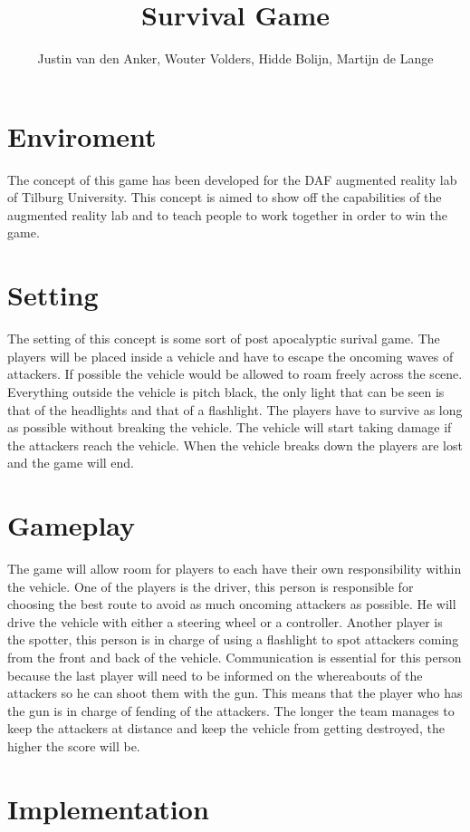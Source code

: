 \documentclass[10pt,a4paper]{article}
\author{Justin van den Anker, Wouter Volders, Hidde Bolijn, Martijn de Lange}
\title{Survival Game}
\begin{document}
\maketitle

\section{Enviroment}
The concept of this game has been developed for the DAF augmented reality lab of Tilburg University. This concept is aimed to show off the capabilities of the augmented reality lab and to teach people to work together in order to win the game.

\section{Setting}
The setting of this concept is some sort of post apocalyptic surival game. The players will be placed inside a vehicle and have to escape the oncoming waves of attackers. If possible the vehicle would be allowed to roam freely across the scene. Everything outside the vehicle is pitch black, the only light that can be seen is that of the headlights and that of a flashlight. The players have to survive as long as possible without breaking the vehicle. The vehicle will start taking damage if the attackers reach the vehicle. When the vehicle breaks down the players are lost and the game will end.

\section{Gameplay}
The game will allow room for players to each have their own responsibility within the vehicle. One of the players is the driver, this person is responsible for choosing the best route to avoid as much oncoming attackers as possible. He will drive the vehicle with either a steering wheel or a controller. Another player is the spotter, this person is in charge of using a flashlight to spot attackers coming from the front and back of the vehicle. Communication is essential for this person because the last player will need to be informed on the whereabouts of the attackers so he can shoot them with  the gun. This means that the player who has the gun is in charge of fending of the attackers. The longer the team manages to keep the attackers at distance and keep the vehicle from getting destroyed, the higher the score will be.

\section{Implementation}
\end{document}
